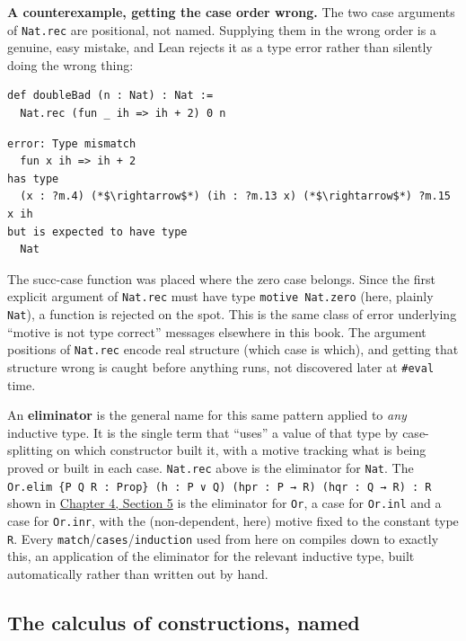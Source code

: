 \textbf{A counterexample, getting the case order wrong.} The two case arguments of \texttt{Nat.rec} are positional, not named. Supplying them in the wrong order is a genuine, easy mistake, and Lean rejects it as a type error rather than silently doing the wrong thing:

\begin{lstlisting}
def doubleBad (n : Nat) : Nat :=
  Nat.rec (fun _ ih => ih + 2) 0 n
\end{lstlisting}

\begin{lstlisting}
error: Type mismatch
  fun x ih => ih + 2
has type
  (x : ?m.4) (*$\rightarrow$*) (ih : ?m.13 x) (*$\rightarrow$*) ?m.15 x ih
but is expected to have type
  Nat
\end{lstlisting}

The succ-case function was placed where the zero case belongs. Since the first explicit argument of \texttt{Nat.rec} must have type \texttt{motive Nat.zero} (here, plainly \texttt{Nat}), a function is rejected on the spot. This is the same class of error underlying ``motive is not type correct'' messages elsewhere in this book. The argument positions of \texttt{Nat.rec} encode real structure (which case is which), and getting that structure wrong is caught before anything runs, not discovered later at \texttt{\#eval} time.

An \textbf{eliminator} is the general name for this same pattern applied to \emph{any} inductive type. It is the single term that ``uses'' a value of that type by case-splitting on which constructor built it, with a motive tracking what is being proved or built in each case. \texttt{Nat.rec} above is the eliminator for \texttt{Nat}. The \texttt{Or.elim \{P Q R : Prop\} (h : P ∨ Q) (hpr : P → R) (hqr : Q → R) : R} shown in \hyperref[sec:04-propositions-and-proofs:05-and-or-not:1]{Chapter 4, Section 5} is the eliminator for \texttt{Or}, a case for \texttt{Or.inl} and a case for \texttt{Or.inr}, with the (non-dependent, here) motive fixed to the constant type \texttt{R}. Every \texttt{match}/\texttt{cases}/\texttt{induction} used from here on compiles down to exactly this, an application of the eliminator for the relevant inductive type, built automatically rather than written out by hand.

\subsection{The calculus of constructions, named}\label{sec:02-terminology-and-coc:02-pi-sigma-and-coc:7}

